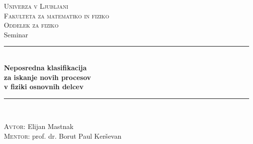 \documentclass[14pt, t]{beamer}
\begin{document}
\begin{frame}[plain]
    \begin{center}

    \vspace{-4mm}
    \small{\textsc{Univerza v Ljubljani}}\\
    \small{\textsc{Fakulteta za {\color{ul-red} matematiko in fiziko}}}\\[1mm]
    \footnotesize{\textsc{Oddelek za fiziko}}\\
    \vspace{2mm}
    \large{Seminar}\\
    \vspace{-2mm}
    \rule{\textwidth}{0.2pt}\\[3mm]

    
    {\Large \textbf{Neposredna klasifikacija}} \\[-1mm]
    {\small \textbf{za iskanje novih procesov}}\\[-2mm]
    {\small \textbf{v fiziki osnovnih delcev}}

    \vspace{-1mm}
    \rule{\textwidth}{0.2pt}\\[3mm]

    \vspace{5mm}

    \scriptsize{\textsc{Avtor:} Elijan Mastnak}\\
    \scriptsize{\textsc{Mentor:} prof. dr. Borut Paul Ker\v{s}evan}\\

    \end{center}
    
\end{frame}

\end{document}
